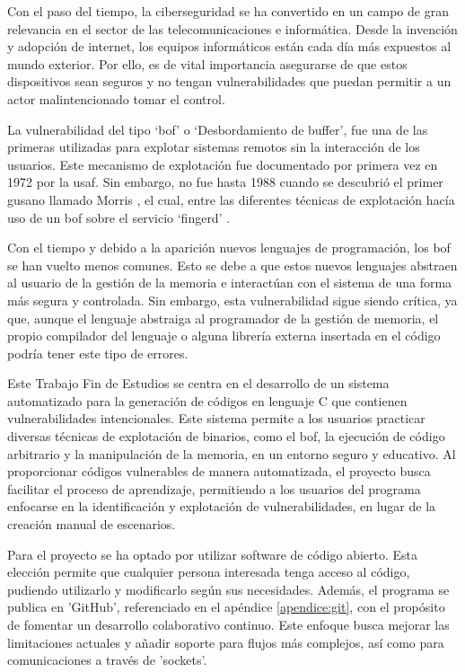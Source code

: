 Con el paso del tiempo, la ciberseguridad se ha convertido en un campo de gran relevancia en el sector de las telecomunicaciones e informática.
Desde la invención y adopción de internet, los equipos informáticos están cada día más expuestos al mundo exterior.
Por ello, es de vital importancia asegurarse de que estos dispositivos sean seguros y no tengan vulnerabilidades que puedan permitir a un actor malintencionado tomar el control.

La vulnerabilidad del tipo `\acrfull{bof}' o `Desbordamiento de buffer', fue una de las primeras utilizadas para explotar sistemas remotos sin la interacción de los usuarios.
Este mecanismo de explotación fue documentado por primera vez en 1972 por la \acrfull{usaf}.
Sin embargo, no fue hasta 1988 cuando se descubrió el primer gusano llamado Morris \cite{Morris}, el cual, entre las diferentes técnicas de explotación hacía uso de un \acrshort{bof} sobre el servicio `fingerd' \cite{Fingerd}.

Con el tiempo y debido a la aparición nuevos lenguajes de programación, los \acrshort{bof} se han vuelto menos comunes.
Esto se debe a que estos nuevos lenguajes abstraen al usuario de la gestión de la memoria e interactúan con el sistema de una forma más segura y controlada.
Sin embargo, esta vulnerabilidad sigue siendo crítica, ya que, aunque el lenguaje abstraiga al programador de la gestión de memoria, el propio compilador del lenguaje o alguna librería externa insertada en el código podría tener este tipo de errores.

Este Trabajo Fin de Estudios se centra en el desarrollo de un sistema automatizado para la generación de códigos en lenguaje C que contienen vulnerabilidades intencionales. Este sistema permite a los usuarios practicar diversas técnicas de explotación de binarios, como el \acrshort{bof}, la ejecución de código arbitrario y la manipulación de la memoria, en un entorno seguro y educativo.
Al proporcionar códigos vulnerables de manera automatizada, el proyecto busca facilitar el proceso de aprendizaje, permitiendo a los usuarios del programa enfocarse en la identificación y explotación de vulnerabilidades, en lugar de la creación manual de escenarios.

Para el proyecto se ha optado por utilizar software de código abierto.
Esta elección permite que cualquier persona interesada tenga acceso al código, pudiendo utilizarlo y modificarlo según sus necesidades.
Además, el programa se publica en 'GitHub', referenciado en el apéndice \ref{apendice:git}, con el propósito de fomentar un desarrollo colaborativo continuo.
Este enfoque busca mejorar las limitaciones actuales y añadir soporte para flujos más complejos, así como para comunicaciones a través de 'sockets'.